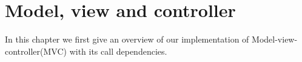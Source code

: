\chapter{Model, view and controller}
In this chapter we first give an overview of our implementation of Model-view-controller(MVC) with its call dependencies.

